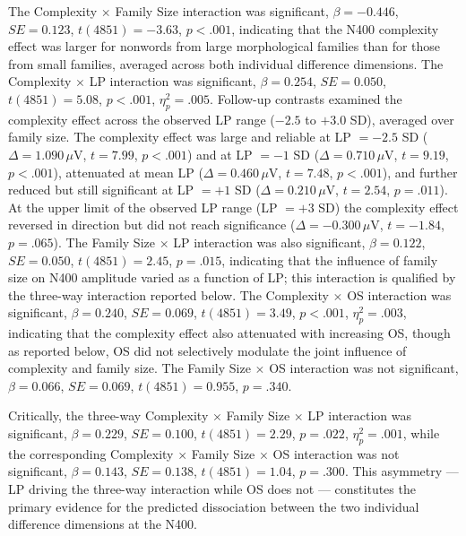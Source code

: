 \documentclass[utf8]{FrontiersinHarvard} %
\begin{document}
	The Complexity $\times$ Family Size interaction was significant, $\beta = -0.446$, $SE = 0.123$, $t(4851) = -3.63$, $p < .001$, indicating that the N400 complexity effect was larger for nonwords from large morphological families than for those from small families, averaged across both individual difference dimensions. The Complexity $\times$ LP interaction was significant, $\beta = 0.254$, $SE = 0.050$, $t(4851) = 5.08$, $p < .001$, $\eta^2_p = .005$. Follow-up contrasts examined the complexity effect across the observed LP range ($-2.5$ to $+3.0$ SD), averaged over family size. The complexity effect was large and reliable at LP $= -2.5$ SD ($\Delta = 1.090\,\mu$V, $t = 7.99$, $p < .001$) and at LP $= -1$ SD ($\Delta = 0.710\,\mu$V, $t = 9.19$, $p < .001$), attenuated at mean LP ($\Delta = 0.460\,\mu$V, $t = 7.48$, $p < .001$), and further reduced but still significant at LP $= +1$ SD ($\Delta = 0.210\,\mu$V, $t = 2.54$, $p = .011$). At the upper limit of the observed LP range (LP $= +3$ SD) the complexity effect reversed in direction but did not reach significance ($\Delta = -0.300\,\mu$V, $t = -1.84$, $p = .065$).  The Family Size $\times$ LP interaction was also significant, $\beta = 0.122$, $SE = 0.050$, $t(4851) = 2.45$, $p = .015$, indicating that the influence of family size on N400 amplitude varied as a function of LP; this interaction is qualified by the three-way interaction reported below. The Complexity $\times$ OS interaction was significant, $\beta = 0.240$, $SE = 0.069$, $t(4851) = 3.49$, $p < .001$, $\eta^2_p = .003$, indicating that the complexity effect also attenuated with increasing OS, though as reported below, OS did not selectively modulate the joint influence of complexity and family size. The Family Size $\times$ OS interaction was not significant, $\beta = 0.066$, $SE = 0.069$, $t(4851) = 0.955$, $p = .340$.
	
	Critically, the three-way Complexity $\times$ Family Size $\times$ LP interaction was significant, $\beta = 0.229$, $SE = 0.100$, $t(4851) = 2.29$, $p = .022$, $\eta^2_p = .001$, while the corresponding Complexity $\times$ Family Size $\times$ OS interaction was not significant, $\beta = 0.143$, $SE = 0.138$, $t(4851) = 1.04$, $p = .300$. This asymmetry --- LP driving the three-way interaction while OS does not --- constitutes the primary evidence for the predicted dissociation between the two individual difference dimensions at the N400.
	
\end{document}
